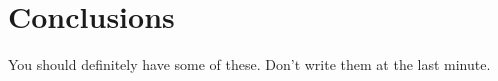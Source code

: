 
\chapter{Conclusions}
\label{sec:Conclusions}

You should definitely have some of these.
Don't write them at the last minute.
